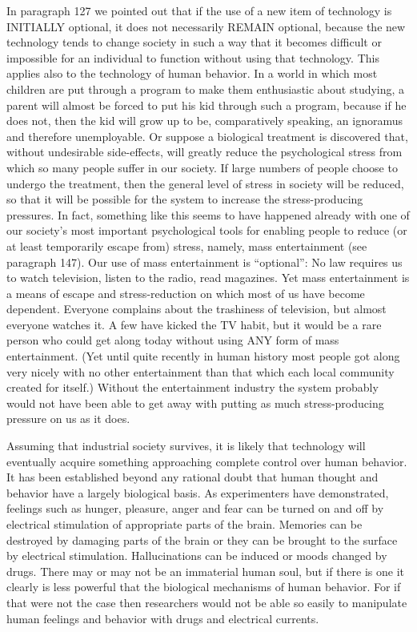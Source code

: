  In paragraph 127 we pointed out that if the use of a new item of technology is INITIALLY optional, it does not necessarily REMAIN optional, because the new technology tends to change society in such a way that it becomes difficult or impossible for an individual to function without using that technology. This applies also to the technology of human behavior. In a world in which most children are put through a program to make them enthusiastic about studying, a parent will almost be forced to put his kid through such a program, because if he does not, then the kid will grow up to be, comparatively speaking, an ignoramus and therefore unemployable. Or suppose a biological treatment is discovered that, without undesirable side-effects, will greatly reduce the psychological stress from which so many people suffer in our society. If large numbers of people choose to undergo the treatment, then the general level of stress in society will be reduced, so that it will be possible for the system to increase the stress-producing pressures. In fact, something like this seems to have happened already with one of our society’s most important psychological tools for enabling people to reduce (or at least temporarily escape from) stress, namely, mass entertainment (see paragraph 147). Our use of mass entertainment is “optional”: No law requires us to watch television, listen to the radio, read magazines. Yet mass entertainment is a means of escape and stress-reduction on which most of us have become dependent. Everyone complains about the trashiness of television, but almost everyone watches it. A few have kicked the TV habit, but it would be a rare person who could get along today without using ANY form of mass entertainment. (Yet until quite recently in human history most people got along very nicely with no other entertainment than that which each local community created for itself.) Without the entertainment industry the system probably would not have been able to get away with putting as much stress-producing pressure on us as it does.

 Assuming that industrial society survives, it is likely that technology will eventually acquire something approaching complete control over human behavior. It has been established beyond any rational doubt that human thought and behavior have a largely biological basis. As experimenters have demonstrated, feelings such as hunger, pleasure, anger and fear can be turned on and off by electrical stimulation of appropriate parts of the brain. Memories can be destroyed by damaging parts of the brain or they can be brought to the surface by electrical stimulation. Hallucinations can be induced or moods changed by drugs. There may or may not be an immaterial human soul, but if there is one it clearly is less powerful that the biological mechanisms of human behavior. For if that were not the case then researchers would not be able so easily to manipulate human feelings and behavior with drugs and electrical currents.

